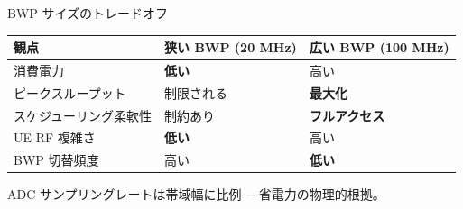 \begin{frame}{BWP サイズのトレードオフ}
\centering
\begin{tabular}{lll}
\toprule
観点 & 狭い BWP (20 MHz) & 広い BWP (100 MHz) \\
\midrule
消費電力             & \textbf{低い}     & 高い \\
ピークスループット   & 制限される        & \textbf{最大化} \\
スケジューリング柔軟性 & 制約あり          & \textbf{フルアクセス} \\
UE RF 複雑さ          & \textbf{低い}     & 高い \\
BWP 切替頻度          & 高い              & \textbf{低い} \\
\bottomrule
\end{tabular}

\vspace{0.6em}
{\small ADC サンプリングレートは帯域幅に比例 ─ 省電力の物理的根拠。}
\end{frame}
